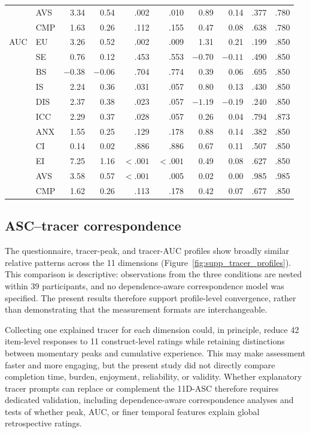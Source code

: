 \documentclass[pdflatex,sn-basic,lineno]{../sn-jnl}
\begin{document}
\begin{table}[!htbp]
\begin{tabular*}{\textwidth}{@{\extracolsep{\fill}}llrrrrrrrr@{}}
     & AVS & 3.34 & 0.54 & .002 & .010 & 0.89 & 0.14 & .377 & .780 \\
     & CMP & 1.63 & 0.26 & .112 & .155 & 0.47 & 0.08 & .638 & .780 \\
\midrule
AUC  & EU  & 3.26 & 0.52 & .002 & .009 & 1.31 & 0.21 & .199 & .850 \\
     & SE  & 0.76 & 0.12 & .453 & .553 & $-0.70$ & $-0.11$ & .490 & .850 \\
     & BS  & $-0.38$ & $-0.06$ & .704 & .774 & 0.39 & 0.06 & .695 & .850 \\
     & IS  & 2.24 & 0.36 & .031 & .057 & 0.80 & 0.13 & .430 & .850 \\
     & DIS & 2.37 & 0.38 & .023 & .057 & $-1.19$ & $-0.19$ & .240 & .850 \\
     & ICC & 2.29 & 0.37 & .028 & .057 & 0.26 & 0.04 & .794 & .873 \\
     & ANX & 1.55 & 0.25 & .129 & .178 & 0.88 & 0.14 & .382 & .850 \\
     & CI  & 0.14 & 0.02 & .886 & .886 & 0.67 & 0.11 & .507 & .850 \\
     & EI  & 7.25 & 1.16 & $<.001$ & $<.001$ & 0.49 & 0.08 & .627 & .850 \\
     & AVS & 3.58 & 0.57 & $<.001$ & .005 & 0.02 & 0.00 & .985 & .985 \\
     & CMP & 1.62 & 0.26 & .113 & .178 & 0.42 & 0.07 & .677 & .850 \\
\bottomrule
\end{tabular*}
\end{table}
\FloatBarrier

\subsection{ASC--tracer correspondence}

The questionnaire, tracer-peak, and tracer-AUC profiles show broadly similar relative patterns across the 11 dimensions (Figure~\ref{fig:supp_tracer_profiles}). This comparison is descriptive: observations from the three conditions are nested within 39 participants, and no dependence-aware correspondence model was specified. The present results therefore support profile-level convergence, rather than demonstrating that the measurement formats are interchangeable.

Collecting one explained tracer for each dimension could, in principle, reduce 42 item-level responses to 11 construct-level ratings while retaining distinctions between momentary peaks and cumulative experience. This may make assessment faster and more engaging, but the present study did not directly compare completion time, burden, enjoyment, reliability, or validity. Whether explanatory tracer prompts can replace or complement the 11D-ASC therefore requires dedicated validation, including dependence-aware correspondence analyses and tests of whether peak, AUC, or finer temporal features explain global retrospective ratings.
\end{document}
